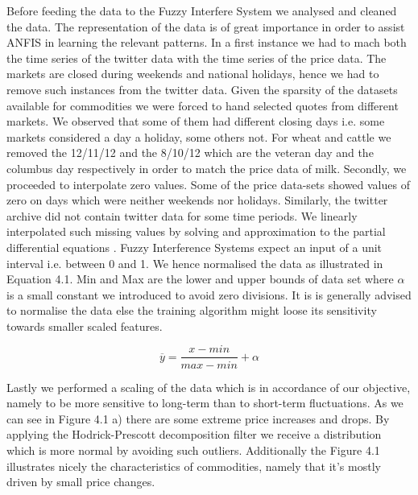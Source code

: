 Before feeding the data to the Fuzzy Interfere System we analysed and cleaned the data. The representation of the data is of great importance in order to assist ANFIS in learning the relevant patterns. In a first instance we had to mach both the time series of the twitter data with the time series of the price data. The markets are closed during weekends and national holidays, hence we had to remove such instances from the twitter data. Given the sparsity of the datasets available for commodities we were forced to hand selected quotes from different markets. We observed that some of them had different closing days i.e. some markets considered a day a holiday, some others not. For wheat and cattle we removed the 12/11/12 and the 8/10/12 which are the veteran day and the columbus day respectively in order to match the price data of milk.  Secondly, we proceeded to interpolate zero values. Some of the price data-sets showed values of zero on days which were neither weekends nor holidays. Similarly, the twitter archive did not contain  twitter data for some time periods. We linearly interpolated such missing values by solving and approximation to the partial differential equations \cite{john2012}.  Fuzzy Interference Systems expect an input of a unit interval i.e. between 0 and 1. We hence normalised the data as illustrated in Equation 4.1. Min and Max are the lower and upper bounds of data set where $\alpha$ is a small constant we introduced to avoid zero divisions. It is is generally advised to normalise the data else the training algorithm might loose its sensitivity towards smaller scaled features. 

\begin{equation} \label{eq:solve}
\overline{ y } = \frac{x - min}{max - min}  + \alpha \end{equation}


Lastly we performed a scaling of the data which is in accordance of our objective, namely to be more sensitive to long-term than to short-term fluctuations. As we can see in Figure 4.1 a) there are some extreme price increases and drops. By applying the Hodrick-Prescott decomposition \cite{edward81} filter we receive a distribution which is more normal by avoiding such outliers. Additionally the Figure 4.1 illustrates nicely the characteristics of commodities, namely that it's mostly driven by small price changes. 






